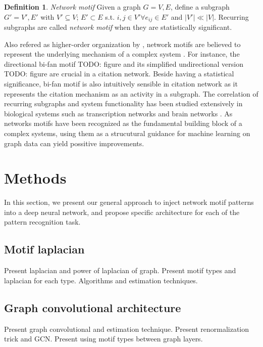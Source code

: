 \documentclass{article}
\theoremstyle{definition}
\newtheorem{definition}{Definition}[section]
\begin{document}
\begin{definition}{\emph{Network motif}}
Given a graph $G = {V,E}$, define a subgraph $G' = {V', E'}$ with $V' \subseteq V$;
$E' \subset E$ s.t. $i,j \in V' \forall e_{ij} \in E'$ and $|V'| \ll |V|$. Recurring subgraphs
are called \emph{network motif} when they are statistically significant.
\end{definition}

Also refered as higher-order organization by \citeauthor{juremotif}, network motifs
are believed to represent the underlying mechanism of a complex system \cite{netmotif,alon2006introduction,mangan2003structure}. 
For instance, the directional bi-fan motif TODO: figure
and its simplified undirectional version TODO: figure are crucial in a citation network. 
Beside having a statistical significance, bi-fan motif is also intuitively 
sensible in citation network as it represents the citation mechanism as an activity
in a subgraph. The correlation of recurring subgraphs and system functionality has 
been studied extensively in biological systems such as 
transcription networks \cite{mangan2003structure} and brain 
networks \cite{brainnetheuvel,honey2007network}. As networks motifs
have been recognized as the fundamental building block of a complex
systems, using them as a strucutural guidance for machine learning
on graph data can yield possitive improvements.


\section{Methods}

In this section, we present our general approach to inject network
motif patterns into a deep neural network, and propose specific 
architecture for each of the pattern recognition task.

\subsection{Motif laplacian}

Present laplacian and power of laplacian of graph.
Present motif types and laplacian for each type.
Algorithms and estimation techniques.

\subsection{Graph convolutional architecture}

Present graph convolutional and estimation technique.
Present renormalization trick and GCN.
Present using motif types between graph layers.
\end{document}
